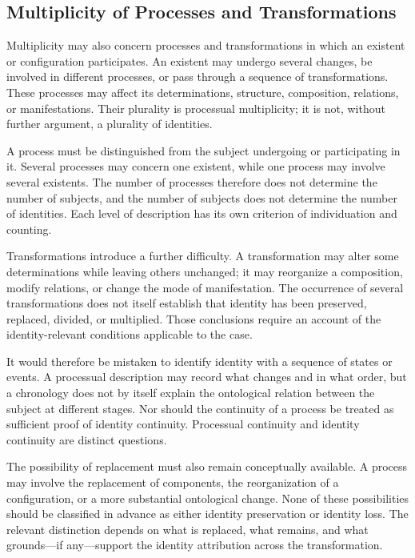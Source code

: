 \subsection{Multiplicity of Processes and Transformations}

Multiplicity may also concern processes and transformations
in which an existent or configuration participates. An existent
may undergo several changes, be involved in different processes,
or pass through a sequence of transformations. These processes
may affect its determinations, structure, composition, relations,
or manifestations. Their plurality is processual multiplicity;
it is not, without further argument, a plurality of identities.

A process must be distinguished from the subject undergoing
or participating in it. Several processes may concern one
existent, while one process may involve several existents.
The number of processes therefore does not determine the
number of subjects, and the number of subjects does not
determine the number of identities. Each level of description
has its own criterion of individuation and counting.

Transformations introduce a further difficulty. A transformation
may alter some determinations while leaving others unchanged;
it may reorganize a composition, modify relations, or change
the mode of manifestation. The occurrence of several
transformations does not itself establish that identity has
been preserved, replaced, divided, or multiplied. Those
conclusions require an account of the identity-relevant
conditions applicable to the case.

It would therefore be mistaken to identify identity with
a sequence of states or events. A processual description
may record what changes and in what order, but a chronology
does not by itself explain the ontological relation between
the subject at different stages. Nor should the continuity
of a process be treated as sufficient proof of identity
continuity. Processual continuity and identity continuity
are distinct questions.

The possibility of replacement must also remain conceptually
available. A process may involve the replacement of components,
the reorganization of a configuration, or a more substantial
ontological change. None of these possibilities should be
classified in advance as either identity preservation or
identity loss. The relevant distinction depends on what is
replaced, what remains, and what grounds—if any—support
the identity attribution across the transformation.

